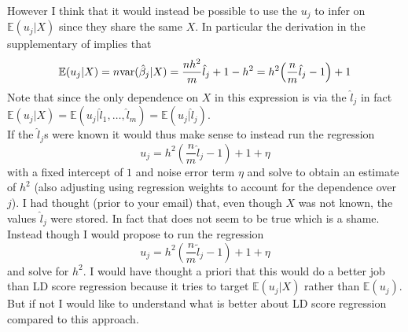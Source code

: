 However I think that it would instead be possible to use the $ u_j $ to infer on $ \mathbb{E}(u_j|X) $ since they share the same $ X $. In particular the derivation in the supplementary of \cite{Bulik2015} implies that 
\begin{align*}
	 \mathbb{E}(u_j|X) = n\var(\hat{\beta}_j| X) = \frac{nh^2}{m}\hat{l}_j + 1-h^2= h^2\left(\frac{n}{m}\hat{l}_j - 1\right) + 1
\end{align*} 
Note that since the only dependence on $ X $ in this expression is via the $ \hat{l}_j $  in fact $ \mathbb{E}(u_j|X) = \mathbb{E}(u_j| \hat{l}_1, \dots, \hat{l}_m) = \mathbb{E}(u_j|\hat{l}_j) $.\\

\noindent If the $ \hat{l}_j $s were known it would thus make sense to instead run the regression
\begin{equation*}
	u_j = h^2\left(\frac{n}{m}\hat{l}_j - 1\right) + 1 + \eta
\end{equation*}
with a fixed intercept of $ 1 $ and noise error term $ \eta $ and solve to obtain an estimate of $ h^2$ (also adjusting using regression weights to account for the dependence over $ j $). I had thought (prior to your email) that, even though $ X  $ was not known, the values $ \hat{l}_j $ were stored. In fact that does not seem to be true which is a shame. Instead though I would propose to run the regression 
\begin{equation*}
u_j = h^2\left(\frac{n}{m}\tilde{l}_j - 1\right) + 1 + \eta
\end{equation*} 
and solve for $ h^2. $ I would have thought a priori that this would do a better job than LD score regression because it tries to target $ \mathbb{E}(u_j|X) $ rather than $ \mathbb{E}(u_j) $. But if not I would like to understand what is better about LD score regression compared to this approach.

